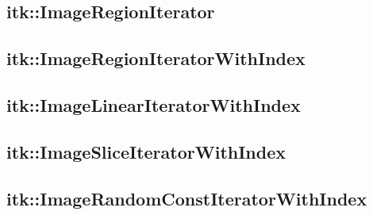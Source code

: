 
\subsection{itk::ImageRegionIterator}
\label{sec:itkImageRegionIterator}


\subsection{itk::ImageRegionIteratorWithIndex}
\label{sec:itkImageRegionIteratorWithIndex}


\subsection{itk::ImageLinearIteratorWithIndex}
\label{sec:itkImageLinearIteratorWithIndex}


\subsection{itk::ImageSliceIteratorWithIndex}
\label{sec:itkImageSliceIteratorWithIndex}


\subsection{itk::ImageRandomConstIteratorWithIndex}
\label{sec:itkImageRandomConstIteratorWithIndex}



